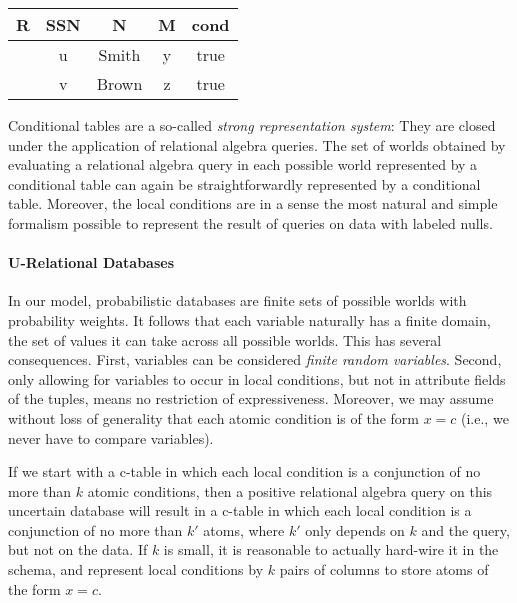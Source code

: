 \begin{center}
	\begin{tabular}{c|c|c|c|c}
		\hline
		R & SSN & N & M & cond\\\hline
		  & u & Smith & y & true \\
		  & v & Brown & z & true \\
	\end{tabular}
\end{center}


Conditional tables are a so-called {\em strong representation system}\/: They are closed under the application of relational algebra queries. The set of worlds obtained by evaluating a relational algebra query in each possible world represented by a conditional table can again be straightforwardly represented by a conditional table. Moreover, the local conditions are in a sense the most natural and simple formalism possible to represent the result of queries on data with labeled nulls.



\paragraph{U-Relational Databases}
%
In our model, probabilistic databases are finite sets of possible worlds with probability weights. It follows that each variable naturally has a finite domain, the set of values it can take across all possible worlds. This has several consequences.
%
First, variables can be considered {\em finite random variables}\/.
Second, only allowing for variables to occur in local conditions,
but not in attribute fields of the tuples,
means no restriction of expressiveness.
Moreover, we may assume without loss of generality that each atomic condition is of the form $x=c$ (i.e., we never have to compare variables).

If we start with a c-table in which each local condition is a conjunction of no more than $k$ atomic conditions, then a positive relational algebra query on this uncertain database will result in a c-table in which each local condition is a conjunction of no more than $k'$ atoms, where $k'$ only depends on $k$ and the query, but not on the data. If $k$ is small, it is reasonable to actually hard-wire it in the schema, and represent local conditions by $k$ pairs of columns to store atoms of the form $x=c$.

